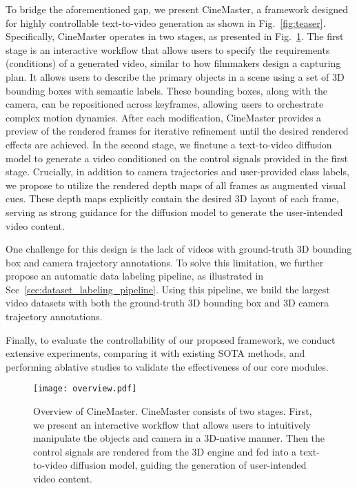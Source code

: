 To bridge the aforementioned gap, we present CineMaster, a framework designed for highly controllable text-to-video generation as shown in Fig.~\ref{fig:teaser}. Specifically, CineMaster operates in two stages, as presented in Fig.~\ref{fig:overview}. The first stage is an interactive workflow that allows users to specify the requirements (conditions) of a generated video, similar to how filmmakers design a capturing plan. It allows users to describe the primary objects in a scene using a set of 3D bounding boxes with semantic labels. These bounding boxes, along with the camera, can be repositioned across keyframes, allowing users to orchestrate complex motion dynamics. After each modification, CineMaster provides a preview of the rendered frames for iterative refinement until the desired rendered effects are achieved. In the second stage, we finetune a text-to-video diffusion model to generate a video conditioned on the control signals provided in the first stage. Crucially, in addition to camera trajectories and user-provided class labels, we propose to utilize the rendered depth maps of all frames as augmented visual cues. These depth maps explicitly contain the desired 3D layout of each frame, serving as strong guidance for the diffusion model to generate the user-intended video content.


One challenge for this design is the lack of videos with ground-truth 3D bounding box and camera trajectory annotations. To solve this limitation, we further propose an automatic data labeling pipeline, as illustrated in Sec~\ref{sec:dataset_labeling_pipeline}. Using this pipeline, we build the largest video datasets with both the ground-truth 3D bounding box and 3D camera trajectory annotations.


Finally, to evaluate the controllability of our proposed framework, we conduct extensive experiments, comparing it with existing SOTA methods, and performing ablative studies to validate the effectiveness of our core modules.



\begin{figure}[!t]
  \centering
  \texttt{[image: overview.pdf]}
  \vspace{-15pt}
  \caption{Overview of CineMaster. CineMaster consists of two stages. First, we present an interactive workflow that allows users to intuitively manipulate the objects and camera in a 3D-native manner. Then the control signals are rendered from the 3D engine and fed into a text-to-video diffusion model, guiding the generation of user-intended video content.}
  \vspace{-8pt}
  \label{fig:overview}
\end{figure}

